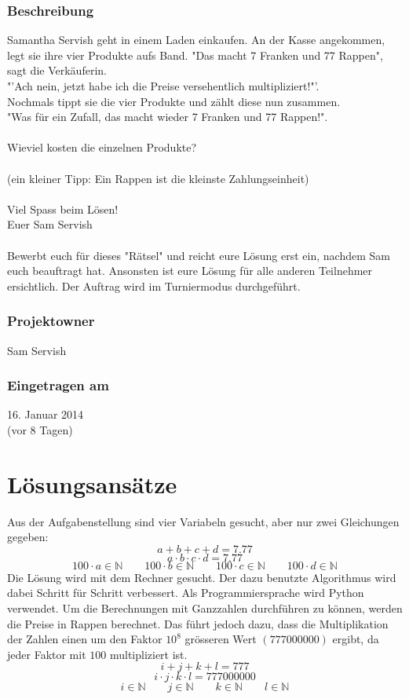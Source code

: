 \documentclass[10pt, fleqn]{article}
\begin{document}
\subsubsection*{Beschreibung}
Samantha Servish geht in einem Laden einkaufen. An der Kasse angekommen, legt 
sie ihre vier Produkte aufs Band. "Das macht 7 Franken und 77 Rappen", sagt 
die Verkäuferin. \\
"'Ach nein, jetzt habe ich die Preise versehentlich multipliziert!"'. \\
Nochmals tippt sie die vier Produkte und zählt diese nun zusammen. \\
"Was für ein Zufall, das macht wieder 7 Franken und 77 Rappen!". \\\\
%
Wieviel kosten die einzelnen Produkte? \\\\
%
(ein kleiner Tipp: Ein Rappen ist die kleinste Zahlungseinheit) \\\\
%
Viel Spass beim Lösen! \\
Euer Sam Servish \\\\
%
Bewerbt euch für dieses "Rätsel" und reicht eure Lösung erst ein, nachdem Sam 
euch beauftragt hat. Ansonsten ist eure Lösung für alle anderen Teilnehmer 
ersichtlich. Der Auftrag wird im Turniermodus durchgeführt. 

\subsubsection*{Projektowner}
Sam Servish 

\subsubsection*{Eingetragen am}
16. Januar 2014 \\
(vor 8 Tagen) 

\newpage

\section{Lösungsansätze}
Aus der Aufgabenstellung sind vier Variabeln gesucht, aber nur zwei Gleichungen 
gegeben: 
\[ a + b + c + d = 7.77 \]
\[ a \cdot b \cdot c \cdot d = 7.77 \]
\[ 100 \cdot a \in \mathbb{N} \qquad 100 \cdot b \in \mathbb{N} \qquad 
100 \cdot c \in \mathbb{N} \qquad 100 \cdot d \in \mathbb{N} \]
Die Lösung wird mit dem Rechner gesucht. Der dazu benutzte Algorithmus wird 
dabei Schritt für Schritt verbessert. Als Programmiersprache wird Python 
verwendet. Um die Berechnungen mit Ganzzahlen durchführen zu können, werden 
die Preise in Rappen berechnet. Das führt jedoch dazu, dass die Multiplikation 
der Zahlen einen um den Faktor $10^8$ grösseren Wert $(777000000)$ ergibt, da 
jeder Faktor mit $100$ multipliziert ist. 
\[ i + j + k + l = 777 \]
\[ i \cdot j \cdot k \cdot l = 777000000 \]
\[ i \in \mathbb{N} \qquad j \in \mathbb{N} \qquad 
k \in \mathbb{N} \qquad l \in \mathbb{N} \]
\end{document}
